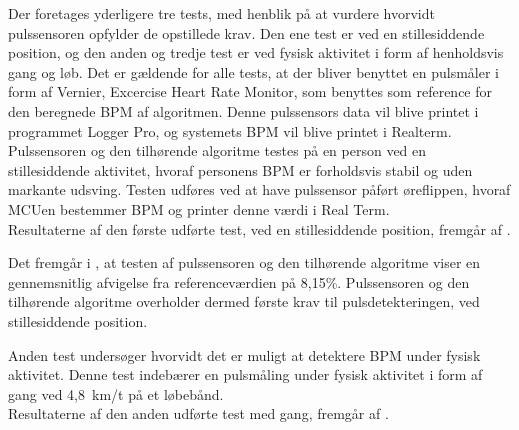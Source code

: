 Der foretages yderligere tre tests, med henblik på at vurdere hvorvidt pulssensoren opfylder de opstillede krav. Den ene test er ved en stillesiddende position, og den anden og tredje test er ved fysisk aktivitet i form af henholdsvis gang og løb. Det er gældende for alle tests, at der bliver benyttet en pulsmåler i form af Vernier, Excercise Heart Rate Monitor, som benyttes som reference for den beregnede BPM af algoritmen. Denne pulssensors data vil blive printet i programmet Logger Pro, og systemets BPM vil blive printet i Realterm. \\
Pulssensoren og den tilhørende algoritme testes på en person ved en stillesiddende aktivitet, hvoraf personens BPM er forholdsvis stabil og uden markante udsving. Testen udføres ved at have pulssensor påført øreflippen, hvoraf MCUen bestemmer BPM og printer denne værdi i Real Term. \\
Resultaterne af den første udførte test, ved en stillesiddende position, fremgår af .
\begin{table}[H]
\centering
{}
	\caption{I tabellen ses det den gennemsnitlige puls fra Logger Pro og Real Term målt på stillesiddende person. Det fremgår, at pulssensoren og den tilhørende algoritme har en afvigelse på 8,15\%.}
	\label{tab:test_pulssystem}
\end{table} \vspace{-0.5cm}



Det fremgår i , at testen af pulssensoren og den tilhørende algoritme viser en gennemsnitlig afvigelse fra referenceværdien på 8,15\%. Pulssensoren og den tilhørende algoritme overholder dermed første krav til pulsdetekteringen, ved stillesiddende position.

Anden test undersøger hvorvidt det er muligt at detektere BPM under fysisk aktivitet. Denne test indebærer en pulsmåling under fysisk aktivitet i form af gang ved 4,8~km/t på et løbebånd.\\
Resultaterne af den anden udførte test med gang, fremgår af .


